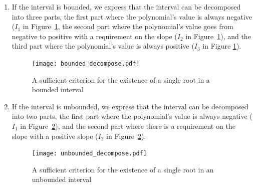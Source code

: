 \documentclass{mscs}
\begin{document}
\begin{enumerate}
\item If the interval is bounded, we express that the interval can be
  decomposed into three parts, the first part where the polynomial's
  value is always negative (\(I_1\) in Figure~\ref{bounded_decompose},
  the second part where the polynomial's
  value goes from negative to positive with a requirement on the
  slope (\(I_2\) in Figure~\ref{bounded_decompose}), and the third
  part where the polynomial's value is always
  positive (\(I_3\) in Figure \ref{bounded_decompose}).
\begin{figure}[h]
\begin{center}
\texttt{[image: bounded\_decompose.pdf]}
\end{center}
\caption{\label{bounded_decompose} A sufficient criterion for the existence of a single root in a bounded interval}
\end{figure}
\item If the interval is unbounded, we express that the interval can
  be decomposed into two parts, the first part where the polynomial's
  value is always negative (\(I_1\) in
  Figure~\ref{unbounded_decompose}), and the second part where there is
  a requirement on the slope with a positive slope (\(I_2\) in
  Figure~\ref{unbounded_decompose}).
\begin{figure}[h]
\begin{center}
\texttt{[image: unbounded\_decompose.pdf]}
\end{center}
\caption{\label{unbounded_decompose} A sufficient criterion for the existence of a single root in an unbounded interval}
\end{figure}
\end{enumerate}
\end{document}
